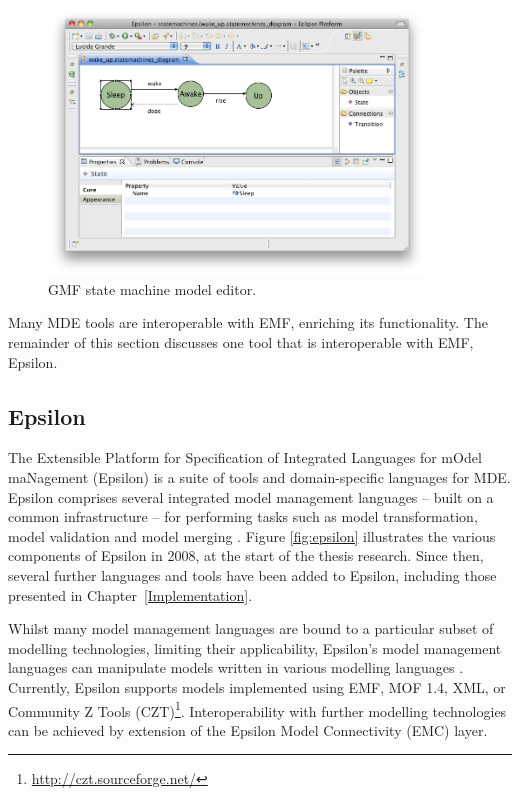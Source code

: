 \begin{figure}[htbp]
  \begin{center}
    \leavevmode
    \includegraphics[width=10cm]{2.Background/images/gmf_model_editor.png}
  \end{center}
  \caption{GMF state machine model editor.}
  \label{fig:gmf_model_editor}
\end{figure}

Many MDE tools are interoperable with EMF, enriching its functionality. The remainder of this section discusses one tool that is interoperable with EMF, Epsilon.

\subsection{Epsilon}
\label{subsec:epsilon}
The Extensible Platform for Specification of Integrated Languages for mOdel maNagement (Epsilon) \cite{kolovos09thesis} is a suite of tools and domain-specific languages for MDE. Epsilon comprises several integrated model management languages -- built on  a common infrastructure -- for performing tasks such as model transformation, model validation and model merging \cite{kolovos09thesis}. Figure \ref{fig:epsilon} illustrates the various components of Epsilon in 2008, at the start of the thesis research. Since then, several further languages and tools have been added to Epsilon, including those presented in Chapter~\ref{Implementation}.

Whilst many model management languages are bound to a particular subset of modelling technologies, limiting their applicability, Epsilon's model management languages can manipulate models written in various modelling languages \cite{kolovos06eol}. Currently, Epsilon supports models implemented using EMF, MOF 1.4, XML, or Community Z Tools (CZT)\footnote{\url{http://czt.sourceforge.net/}}. Interoperability with further modelling technologies can be achieved by extension of the Epsilon Model Connectivity (EMC) layer. 

